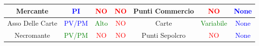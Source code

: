 \documentclass{article}
\begin{document}
\begin{table}[h]
\begin{tabular}{|c|c|c|c|c|c|c|}
      \hline
      \centering Mercante& \textcolor{blue}{PI}   & \textcolor{red}{NO} & \textcolor{red}{NO} & Punti Commercio & \textcolor{red}{NO} &\textcolor{blue}{None} \\
      \hline
      \centering Asso Delle Carte& \textcolor{blue}{PV/PM}   & \textcolor{green}{Alto} & \textcolor{red}{NO} & Carte & \textcolor{green}{Variabile} &\textcolor{blue}{None} \\
      \hline
      \centering Necromante& \textcolor{green}{PV/PM}   & \textcolor{red}{NO} & \textcolor{red}{NO} & Punti Sepolcro & \textcolor{red}{NO} &\textcolor{blue}{None} \\
      \hline
    \end{tabular}
  \end{table}
\end{document}
